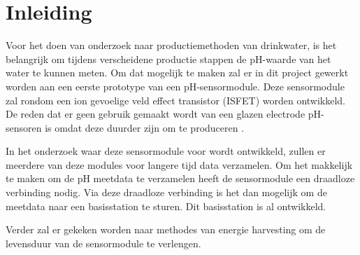 \section{Inleiding}

Voor het doen van onderzoek naar productiemethoden van drinkwater, is het belangrijk om tijdens verscheidene productie stappen de pH-waarde van het water te kunnen meten. Om dat mogelijk te maken zal er in dit project gewerkt worden aan een eerste prototype van een pH-sensormodule. Deze sensormodule zal rondom een ion gevoelige veld effect transistor (ISFET) worden ontwikkeld. De reden dat er geen gebruik gemaakt wordt van een glazen electrode pH-sensoren is omdat deze duurder zijn om te produceren \cite{duroux1991ionpHISFETltspHmonitoring}.

In het onderzoek waar deze sensormodule voor wordt ontwikkeld, zullen er meerdere van deze modules voor langere tijd data verzamelen. Om het makkelijk te maken om de pH meetdata te verzamelen heeft de sensormodule een draadloze verbinding nodig. Via deze draadloze verbinding is het dan mogelijk om de meetdata naar een basisstation te sturen. Dit basisstation is al ontwikkeld.

Verder zal er gekeken worden naar methodes van energie harvesting om de levensduur van de sensormodule te verlengen.